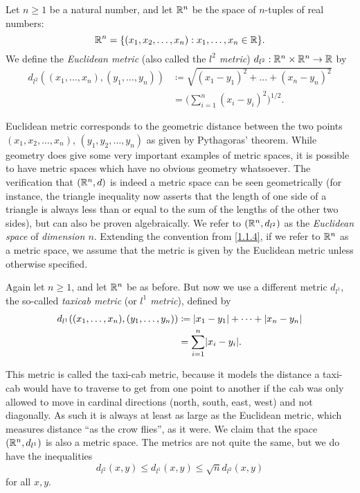 \begin{eg}\label{1.1.6}
  Let \(n \geq 1\) be a natural number, and let \(\mathbb{R}^n\) be the space of \(n\)-tuples of real numbers:
  \[
    \mathbb{R}^n = \{(x_1, x_2, \dots, x_n) : x_1, \dots, x_n \in \mathbb{R}\}.
  \]
  We define the \emph{Euclidean metric} (also called the \emph{\(l^2\) metric}) \(d_{l^2} : \mathbb{R}^n \times\mathbb{R}^n \to \mathbb{R}\) by
  \begin{align*}
    d_{l^2}((x_1, \dots, x_n), (y_1, \dots, y_n)) & \coloneqq \sqrt{(x_1 - y_1)^2 + \dots + (x_n - y_n)^2} \\
                                                  & = \bigg(\sum_{i = 1}^n (x_i - y_i)^2\bigg)^{1 / 2}.
  \end{align*}
\end{eg}

\begin{note}
  Euclidean metric corresponds to the geometric distance between the two points \((x_1, x_2, \dots, x_n)\), \((y_1, y_2, \dots, y_n)\) as given by Pythagoras' theorem.
  While geometry does give some very important examples of metric spaces, it is possible to have metric spaces which have no obvious geometry whatsoever.
  The verification that \((\mathbb{R}^n, d)\) is indeed a metric space can be seen geometrically (for instance, the triangle inequality now asserts that the length of one side of a triangle is always less than or equal to the sum of the lengths of the other two sides), but can also be proven algebraically.
  We refer to \((\mathbb{R}^n , d_{l^2})\) as the \emph{Euclidean space} of \emph{dimension \(n\)}.
  Extending the convention from \cref{1.1.4}, if we refer to \(\mathbb{R}^n\) as a metric space, we assume that the metric is given by the Euclidean metric unless otherwise specified.
\end{note}

\begin{eg}\label{1.1.7}
  Again let \(n \geq 1\), and let \(\mathbb{R}^n\) be as before.
  But now we use a different metric \(d_{l^1}\), the so-called \emph{taxicab metric} (or \emph{\(l^1\) metric}), defined by
  \begin{align*}
    d_{l^1}((x_1, \dots, x_n), (y_1, \dots, y_n)) & \coloneqq \abs{x_1 - y_1} + \dots + \abs{x_n - y_n} \\
                                                  & = \sum_{i = 1}^n \abs{x_i - y_i}.
  \end{align*}
\end{eg}

\begin{note}
  This metric is called the taxi-cab metric, because it models the distance a taxi-cab would have to traverse to get from one point to another if the cab was only allowed to move in cardinal directions (north, south, east, west) and not diagonally.
  As such it is always at least as large as the Euclidean metric, which measures distance ``as the crow flies'', as it were.
  We claim that the space \((\mathbb{R}^n, d_{l^1})\) is also a metric space.
  The metrics are not quite the same, but we do have the inequalities
  \[
    d_{l^2}(x, y) \leq d_{l^1}(x, y) \leq \sqrt{n} d_{l^2}(x, y)
  \]
  for all \(x, y\).
\end{note}

